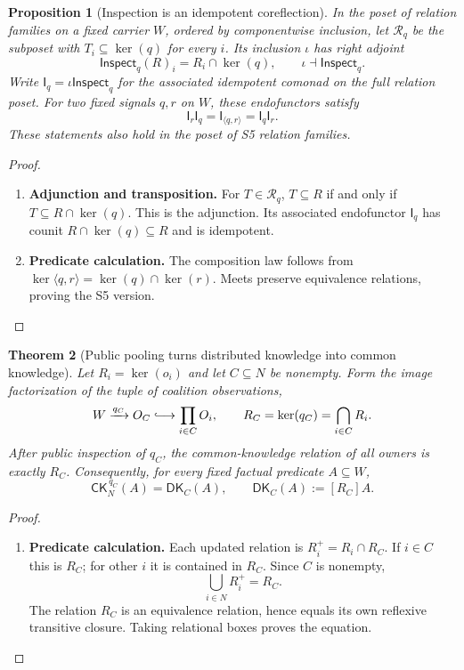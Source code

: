 \documentclass[11pt,a4paper]{article}
\numberwithin{equation}{section}
\newtheorem{theorem}{Theorem}[section]
\newtheorem{proposition}[theorem]{Proposition}
\theoremstyle{definition}
\theoremstyle{remark}
\theoremstyle{plain}
\begin{document}
\begin{proposition}[Inspection is an idempotent coreflection]
\label{prop:egt-inspection-coreflection}
In the poset of relation families on a fixed carrier $W$, ordered by
componentwise inclusion, let $\mathcal R_q$ be the subposet with
$T_i\subseteq\ker(q)$ for every $i$. Its inclusion $\iota$ has
right adjoint
\[
 \mathsf{Inspect}_q(R)_i=R_i\cap\ker(q),
 \qquad\iota\dashv\mathsf{Inspect}_q.
\]
Write $\mathsf I_q=\iota\mathsf{Inspect}_q$ for the associated
idempotent comonad on the full relation poset. For two fixed signals
$q,r$ on $W$, these endofunctors satisfy
\[
 \mathsf I_r\mathsf I_q
 =\mathsf I_{\langle q,r\rangle}
 =\mathsf I_q\mathsf I_r.
\]
These statements also hold in the poset of S5 relation families.
\end{proposition}
\begin{proof}
\leavevmode
\begin{enumerate}[label=\textup{(\arabic*)},leftmargin=*,itemsep=4pt,topsep=3pt]
  \item \textbf{Adjunction and transposition.} For $T\in\mathcal R_q$, $T\subseteq R$ if and only if
$T\subseteq R\cap\ker(q)$. This is the adjunction. Its associated endofunctor $\mathsf I_q$ has counit
$R\cap\ker(q)\subseteq R$ and is idempotent.
  \item \textbf{Predicate calculation.} The composition law follows from
$\ker\langle q,r\rangle=\ker(q)\cap\ker(r)$. Meets preserve
equivalence relations, proving the S5 version.
\end{enumerate}
\end{proof}

\begin{theorem}[Public pooling turns distributed knowledge into common knowledge]
\label{thm:egt-public-pooling}
Let $R_i=\ker(o_i)$ and let $C\subseteq N$ be nonempty. Form the
image factorization of the tuple of coalition observations,
\[
 W\xrightarrow{q_C}O_C\lhook\joinrel\longrightarrow
 \prod_{i\in C}O_i,
 \qquad R_C=\ker(q_C)=\bigcap_{i\in C}R_i.
\]
After public inspection of $q_C$, the common-knowledge relation of all
owners is exactly $R_C$. Consequently, for every fixed factual predicate
$A\subseteq W$,
\[
 \mathsf{CK}_N^{\,q_C}(A)=\mathsf{DK}_C(A),\qquad
 \mathsf{DK}_C(A):=[R_C]A.
\]
\end{theorem}
\begin{proof}
\leavevmode
\begin{enumerate}[label=\textup{(\arabic*)},leftmargin=*,itemsep=4pt,topsep=3pt]
  \item \textbf{Predicate calculation.} Each updated relation is $R_i^+=R_i\cap R_C$. If $i\in C$ this
is $R_C$; for other $i$ it is contained in $R_C$. Since $C$ is nonempty,
\[
 \bigcup_{i\in N}R_i^+=R_C.
\]
The relation $R_C$ is an equivalence relation, hence equals its own
reflexive transitive closure. Taking relational boxes proves the equation.
\end{enumerate}
\end{proof}
\end{document}
